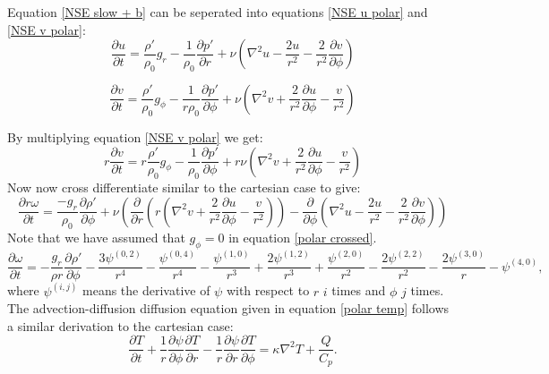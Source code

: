 \documentclass{article}
\begin{document}
Equation \ref{NSE slow + b} can be seperated into equations \ref{NSE u polar} and \ref{NSE v polar}:
\begin{equation}
	\frac{\partial u}{\partial t} = \frac{\rho'}{\rho_0} g_r - \frac{1}{\rho_0} \frac{\partial p'}{\partial r} + \nu ( \nabla^2 u - \frac{2 u}{r^2} - \frac{2}{r^2} \frac{\partial v}{\partial \phi})
	\label{NSE u polar}
\end{equation}

\begin{equation}
	\frac{\partial v}{\partial t} = \frac{\rho'}{\rho_0} g_{\phi} - \frac{1}{r \rho_0} \frac{\partial p'}{\partial \phi} + \nu (\nabla^2 v + \frac{2}{r^2} \frac{\partial u}{\partial \phi} - \frac{v}{r^2})
	\label{NSE v polar}
\end{equation}

By multiplying equation \ref{NSE v polar} we get:
\begin{equation}
	r \frac{\partial v}{\partial t} = r \frac{\rho'}{\rho_0} g_{\phi} - \frac{1}{\rho_0} \frac{\partial p'}{\partial \phi} + r \nu (\nabla^2 v + \frac{2}{r^2} \frac{\partial u}{\partial \phi} - \frac{v}{r^2})
	\label{NSE v polar times r}
\end{equation}
Now now cross differentiate similar to the cartesian case to give:
\begin{equation}
	\frac{\partial r \omega}{\partial t} = \frac{- g_r}{\rho_0} \frac{\partial \rho'}{\partial \phi} + \nu (\frac{\partial}{\partial r} (r(\nabla^2 v + \frac{2}{r^2} \frac{\partial u}{\partial \phi} - \frac{v}{r^2} )) - \frac{\partial}{\partial \phi} (\nabla^2 u - \frac{2 u}{r^2}-\frac{2}{r^2} \frac{\partial v}{\partial \phi} ) )
	\label{polar crossed}
\end{equation}
Note that we have assumed that $g_{\phi} = 0$ in equation \ref{polar crossed}.
\begin{equation}
 \frac{\partial \omega}{\partial t} = -\frac{g_r}{\rho r} \frac{\partial \rho'}{\partial \phi} -\frac{3\psi^{(0,2)}}{r^4}-\frac{\psi^{(0,4)}}{r^4}-\frac{\psi^{(1,0)}}{r^3}+\frac{2\psi^{(1,2)}}{r^3}+\frac{\psi^{(2,0)}}{r^2}-\frac{2\psi^{(2,2)}}{r^2}-\frac{2\psi^{(3,0)}}{r}-\psi^{(4,0)},
 \label{polar vort update}
\end{equation}
where $\psi^{(i,j)}$ means the derivative of $\psi$ with respect to $r$ $i$ times and $\phi$ $j$ times.
\newline
The advection-diffusion diffusion equation given in equation \ref{polar temp} follows a similar derivation to the cartesian case:
\begin{equation}
	\frac{\partial T}{\partial t} + \frac{1}{r} \frac{\partial \psi}{\partial \phi} \frac{\partial T}{\partial r} - \frac{1}{r} \frac{\partial \psi}{\partial r} \frac{\partial T}{\partial \phi} = \kappa \nabla^2 T + \frac{Q}{C_p}.
	\label{polar ad}
\end{equation}






 






 
\end{document}
